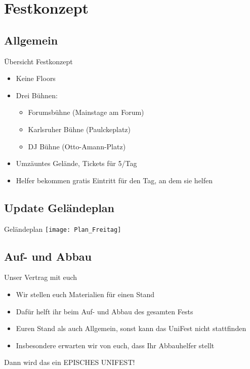 \section{Festkonzept}

\subsection{Allgemein}


\begin{frame}[c]{Übersicht Festkonzept}
    \begin{itemize}
        \item Keine Floors
        \item Drei Bühnen:
            \begin{itemize}
                \item Forumsbühne (Mainstage am Forum)
                \item Karlsruher Bühne (Paulckeplatz)
                \item DJ Bühne (Otto-Amann-Platz)
            \end{itemize}
        \item Umzäuntes Gelände, Tickets für 5\EUR/Tag
        \item Helfer bekommen gratis Eintritt für den Tag, an dem sie helfen
    \end{itemize}
\end{frame}


\subsection{Update Geländeplan}

\begin{frame}[c]{Geländeplan}
    \texttt{[image: Plan\_Freitag]}
\end{frame}




\subsection{Auf- und Abbau}

\begin{frame}[c]{Unser Vertrag mit euch}
    \begin{itemize}[<+(1)->]
        \item Wir stellen euch Materialien für einen Stand
        \item Dafür helft ihr beim Auf- und Abbau des gesamten Fests
        \item<handout> Euren Stand als auch Allgemein, sonst kann das UniFest nicht stattfinden
        \item<handout> Insbesondere erwarten wir von euch, dass Ihr Abbauhelfer stellt
    \end{itemize}
    \Large
    \pause
    Dann wird das ein EPISCHES UNIFEST!
\end{frame}


